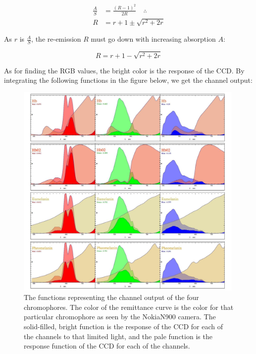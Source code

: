 \begin{align}\label{eq:KubelkaMunk2}
\frac{A}{S} &=\frac{(R-1)^2}{2 R} \quad \therefore\\
R &= r+1 \pm \sqrt{r^2+2 r}
\end{align}

As $r$ is $\frac{A}{S}$, the re-emission $R$ must go down with increasing absorption $A$:

\begin{equation}\label{eq:KubelkaMunk3}
R = r+1 - \sqrt{r^2+2 r}
\end{equation}

As for finding the RGB values, the bright color is the response of the CCD. By integrating the following functions in the figure below, we get the channel output:


\begin{figure}[h!]
  \centering
    \includegraphics[width=0.99\textwidth]{Chapter1/Figs/Chromophores_NokiaN900.jpg}
    \caption{The functions representing the channel output of the four chromophores. The color of the remittance curve is the color for that particular chromophore as seen by the NokiaN900 camera. The solid-filled, bright function is the response of the CCD for each of the channels to that limited light, and the pale function is the response function of the CCD for each of the channels.}  \label{fig:Chromophores_NokiaN900}
\end{figure}



